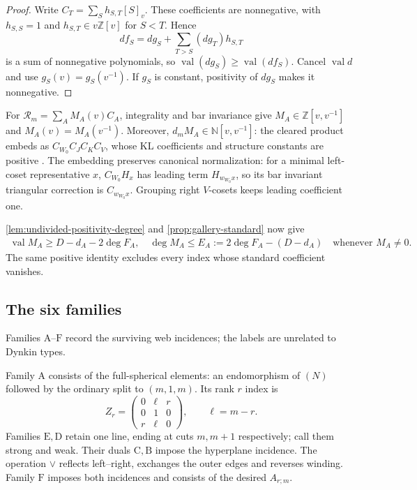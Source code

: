 \documentclass[a4paper,11pt]{amsart}
\numberwithin{equation}{subsection}
\theoremstyle{plain}
\theoremstyle{definition}
\theoremstyle{remark}
\begin{document}
\begin{proof}
Write $C_T=\sum_S h_{S,T}[S]_v$. These coefficients are
nonnegative, with $h_{S,S}=1$ and $h_{S,T}\in v\mathbb Z[v]$
for $S<T$. Hence
\[
df_S=dg_S+\sum_{T>S}(dg_T)h_{S,T}
\]
is a sum of nonnegative polynomials, so
$\operatorname{val}(dg_S)\ge\operatorname{val}(df_S)$.
Cancel $\operatorname{val}d$ and use $g_S(v)=g_S(v^{-1})$.
If $g_S$ is constant, positivity of $dg_S$ makes it nonnegative.
\end{proof}

For $\mathcal R_m=\sum_A M_A(v)C_A$, integrality and bar invariance
give $M_A\in\mathbb Z[v,v^{-1}]$ and $M_A(v)=M_A(v^{-1})$.
Moreover, $d_mM_A\in\mathbb N[v,v^{-1}]$: the cleared product
embeds as $C_{W_0}C_JC_KC_V$,
whose KL coefficients and structure constants are positive
\cite{KL80,Springer82}.
The embedding preserves canonical normalization: for a minimal
left-coset representative $x$, $C_{W_0}H_x$ has leading term
$H_{w_{W_0}x}$, so its bar invariant triangular correction is
$C_{w_{W_0}x}$. Grouping right $V$-cosets keeps leading coefficient one.

\autoref{lem:undivided-positivity-degree} and \autoref{prop:gallery-standard} now give
\begin{gather}\label{eq:relevance-bound}
\operatorname{val}M_A\ge D-d_A-2\deg F_A,\quad
\deg M_A\le E_A:=2\deg F_A-(D-d_A)
\quad\text{whenever }M_A\ne0.
\end{gather}
The same positive identity excludes every
index whose standard coefficient vanishes.

\subsection{The six families}

Families $\mathrm A$--$\mathrm F$ record the surviving web incidences;
the labels are unrelated to Dynkin types.

\begin{definition}\label{def:six-families}
Family $\mathrm A$ consists of the full-spherical elements:
an endomorphism of $(N)$ followed by the ordinary split to $(m,1,m)$.
Its rank $r$ index is
\[
Z_r=\begin{pmatrix}0&\ell&r\\0&1&0\\r&\ell&0\end{pmatrix},
\qquad\ell=m-r.
\]
Families $\mathrm E,\mathrm D$ retain one line, ending at cuts
$m,m+1$ respectively; call them strong and weak.
Their duals $\mathrm C,\mathrm B$ impose the hyperplane incidence.
The operation $\vee$ reflects left--right, exchanges the outer
edges and reverses winding. Family $\mathrm F$ imposes both
incidences and consists of the desired $A_{r;m}$.
\end{definition}
\end{document}
